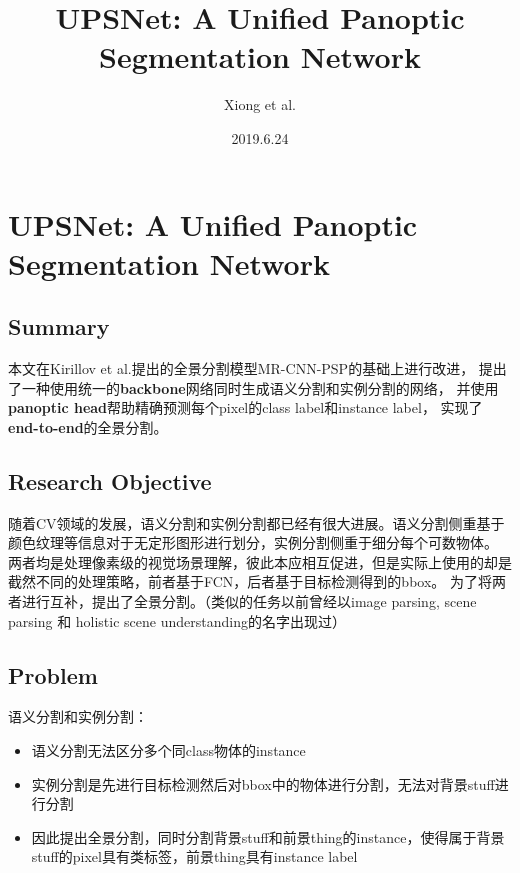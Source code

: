 \documentclass[UTF8, a4paper]{ctexart}
\begin{document}
\title{UPSNet: A Unified Panoptic Segmentation Network}
\author{Xiong et al.}
\date{2019.6.24}
\maketitle
\fi
\section{UPSNet: A Unified Panoptic Segmentation Network}

\subsection{Summary} %

本文在Kirillov et al.提出的全景分割模型MR-CNN-PSP\cite{Pano_Seg_Kirillov_2019_CVPR}的基础上进行改进，
提出了一种使用统一的\textbf{backbone}网络同时生成语义分割和实例分割的网络，
并使用\textbf{panoptic head}帮助精确预测每个pixel的class label和instance label，
实现了\textbf{end-to-end}的全景分割。

\subsection{Research Objective} %

随着CV领域的发展，语义分割和实例分割都已经有很大进展。语义分割侧重基于颜色纹理等信息对于无定形图形进行划分，实例分割侧重于细分每个可数物体。
两者均是处理像素级的视觉场景理解，彼此本应相互促进，但是实际上使用的却是截然不同的处理策略，前者基于FCN，后者基于目标检测得到的bbox。
为了将两者进行互补，提出了全景分割。（类似的任务以前曾经以image parsing, scene parsing 和 holistic scene understanding的名字出现过）

\subsection{Problem} %

语义分割和实例分割：
\begin{itemize}
    \item 语义分割无法区分多个同class物体的instance
    \item 实例分割是先进行目标检测然后对bbox中的物体进行分割，无法对背景stuff进行分割
    \item 因此提出全景分割\cite{Pano_Seg_Kirillov_2019_CVPR}，同时分割背景stuff和前景thing的instance，使得属于背景stuff的pixel具有类标签，前景thing具有instance label
\end{itemize}
\end{document}
